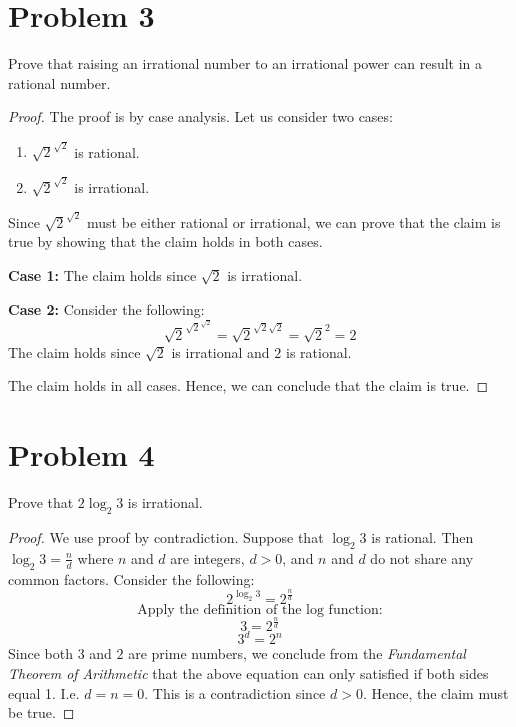 \documentclass{article}
\begin{document}
\pagebreak

\section{Problem 3}
Prove that raising an irrational number to an irrational power can result in a rational number.
\begin{proof}
	The proof is by case analysis. Let us consider two cases:
	\begin{enumerate}
		\item $\sqrt{2}^{\sqrt{2}}$ is rational.
		\item $\sqrt{2}^{\sqrt{2}}$ is irrational.
	\end{enumerate}
	Since $\sqrt{2}^{\sqrt{2}}$ must be either rational or irrational, we can prove that the claim is true by showing that the claim holds in both cases.

	\textbf{Case 1:}
	The claim holds since $\sqrt{2}$ is irrational.

	\textbf{Case 2:}
	Consider the following:
	\[
		\sqrt{2}^{{\sqrt{2}}^{\sqrt{2}}} = \sqrt{2}^{\sqrt{2}\sqrt{2}} = \sqrt{2}^2 = 2
	\]
	The claim holds since $\sqrt{2}$ is irrational and $2$ is rational.

	The claim holds in all cases. Hence, we can conclude that the claim is true.
\end{proof}
\pagebreak

\section{Problem 4}
Prove that $2 \log_2 3$ is irrational.
\begin{proof}
	We use proof by contradiction. Suppose that $\log_2 3$ is rational. Then $\log_2 3 = \frac{n}{d}$ where $n$ and $d$ are integers, $d > 0$, and $n$ and $d$ do not share any common factors. Consider the following:
	\[
		2^{\log_2 3} = 2^{\frac{n}{d}}
	\]
	\[
		\text{Apply the definition of the log function:}
	\]
	\[
		3 = 2^{\frac{n}{d}}
	\]
	\[
		3^d = 2^n
	\]
	Since both $3$ and $2$ are prime numbers, we conclude from the \textit{Fundamental Theorem of Arithmetic} that the above equation can only satisfied if both sides equal 1. I.e. $d = n = 0$. This is a contradiction since $d > 0$. Hence, the claim must be true.
\end{proof}
\end{document}

